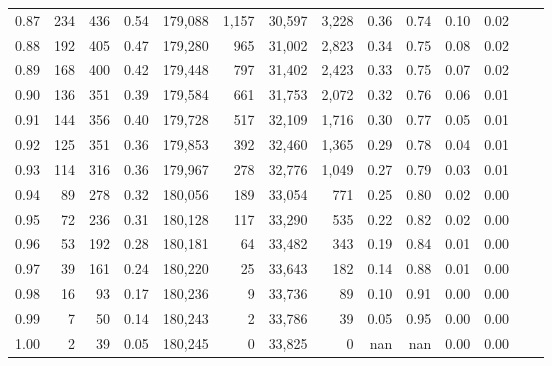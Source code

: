 \begin{tabular}{rrrrrrrrrrrrrr}
0.87 &    234 &  436 &    0.54 &  179,088 &    1,157 &  30,597 &   3,228 &  0.36 &  0.74 &  0.10 &      0.02 \\
0.88 &    192 &  405 &    0.47 &  179,280 &      965 &  31,002 &   2,823 &  0.34 &  0.75 &  0.08 &      0.02 \\
0.89 &    168 &  400 &    0.42 &  179,448 &      797 &  31,402 &   2,423 &  0.33 &  0.75 &  0.07 &      0.02 \\
0.90 &    136 &  351 &    0.39 &  179,584 &      661 &  31,753 &   2,072 &  0.32 &  0.76 &  0.06 &      0.01 \\
0.91 &    144 &  356 &    0.40 &  179,728 &      517 &  32,109 &   1,716 &  0.30 &  0.77 &  0.05 &      0.01 \\
0.92 &    125 &  351 &    0.36 &  179,853 &      392 &  32,460 &   1,365 &  0.29 &  0.78 &  0.04 &      0.01 \\
0.93 &    114 &  316 &    0.36 &  179,967 &      278 &  32,776 &   1,049 &  0.27 &  0.79 &  0.03 &      0.01 \\
0.94 &     89 &  278 &    0.32 &  180,056 &      189 &  33,054 &     771 &  0.25 &  0.80 &  0.02 &      0.00 \\
0.95 &     72 &  236 &    0.31 &  180,128 &      117 &  33,290 &     535 &  0.22 &  0.82 &  0.02 &      0.00 \\
0.96 &     53 &  192 &    0.28 &  180,181 &       64 &  33,482 &     343 &  0.19 &  0.84 &  0.01 &      0.00 \\
0.97 &     39 &  161 &    0.24 &  180,220 &       25 &  33,643 &     182 &  0.14 &  0.88 &  0.01 &      0.00 \\
0.98 &     16 &   93 &    0.17 &  180,236 &        9 &  33,736 &      89 &  0.10 &  0.91 &  0.00 &      0.00 \\
0.99 &      7 &   50 &    0.14 &  180,243 &        2 &  33,786 &      39 &  0.05 &  0.95 &  0.00 &      0.00 \\
1.00 &      2 &   39 &    0.05 &  180,245 &        0 &  33,825 &       0 &   nan &   nan &  0.00 &      0.00 \\
\bottomrule
\end{tabular}
